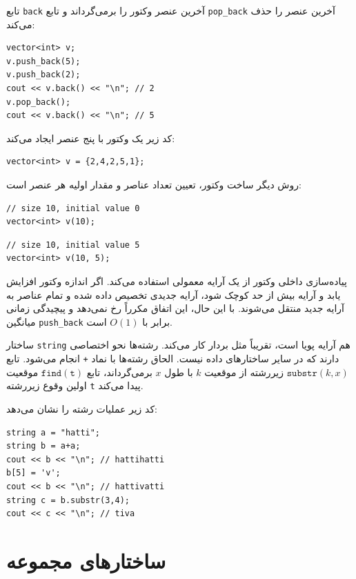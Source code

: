 تابع \texttt{back} آخرین عنصر وکتور را برمی‌گرداند و تابع \texttt{pop\_back} آخرین عنصر را حذف می‌کند:

\begin{lstlisting}
vector<int> v;
v.push_back(5);
v.push_back(2);
cout << v.back() << "\n"; // 2
v.pop_back();
cout << v.back() << "\n"; // 5
\end{lstlisting}

کد زیر یک وکتور با پنج عنصر ایجاد می‌کند:

\begin{lstlisting}
vector<int> v = {2,4,2,5,1};
\end{lstlisting}

روش دیگر ساخت وکتور، تعیین تعداد عناصر و مقدار اولیه هر عنصر است:

\begin{lstlisting}
// size 10, initial value 0
vector<int> v(10);
\end{lstlisting}
\begin{lstlisting}
// size 10, initial value 5
vector<int> v(10, 5);
\end{lstlisting}

پیاده‌سازی داخلی وکتور از یک آرایه معمولی استفاده می‌کند. اگر اندازه وکتور افزایش یابد و آرایه بیش از حد کوچک شود، آرایه جدیدی تخصیص داده شده و تمام عناصر به آرایه جدید منتقل می‌شوند. با این حال، این اتفاق مکرراً رخ نمی‌دهد و پیچیدگی زمانی میانگین \texttt{push\_back} برابر با $O(1)$ است.


ساختار \texttt{string}
هم آرایه پویا است، تقریباً مثل بردار کار می‌کند.
رشته‌ها نحو اختصاصی دارند
که در سایر ساختارهای داده نیست.
الحاق رشته‌ها با نماد \texttt{+} انجام می‌شود.
تابع $\texttt{substr}(k,x)$ زیررشته
از موقعیت $k$ با طول $x$ برمی‌گرداند،
تابع $\texttt{find}(\texttt{t})$ موقعیت
اولین وقوع زیررشته \texttt{t} پیدا می‌کند.

کد زیر عملیات رشته را نشان می‌دهد:

\begin{lstlisting}
string a = "hatti";
string b = a+a;
cout << b << "\n"; // hattihatti
b[5] = 'v';
cout << b << "\n"; // hattivatti
string c = b.substr(3,4);
cout << c << "\n"; // tiva
\end{lstlisting}

\section{ساختارهای مجموعه}


